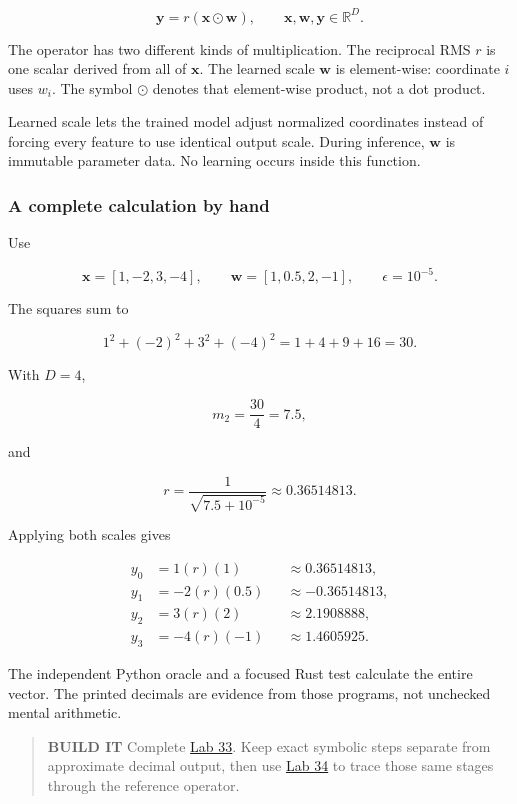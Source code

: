 \documentclass[
  10pt,
]{article}
\begin{document}
\[
\mathbf{y}=r(\mathbf{x}\odot\mathbf{w}),
\qquad
\mathbf{x},\mathbf{w},\mathbf{y}\in\mathbb{R}^{D}.
\]

The operator has two different kinds of multiplication. The reciprocal
RMS \(r\) is one scalar derived from all of \(\mathbf{x}\). The learned
scale \(\mathbf{w}\) is element-wise: coordinate \(i\) uses \(w_i\). The
symbol \(\odot\) denotes that element-wise product, not a dot product.

Learned scale lets the trained model adjust normalized coordinates
instead of forcing every feature to use identical output scale. During
inference, \(\mathbf{w}\) is immutable parameter data. No learning
occurs inside this function.


\subsubsection{A complete calculation by
hand}\label{a-complete-calculation-by-hand}

Use

\[
\mathbf{x}=[1,-2,3,-4],\qquad
\mathbf{w}=[1,0.5,2,-1],\qquad
\epsilon=10^{-5}.
\]

The squares sum to

\[
1^2+(-2)^2+3^2+(-4)^2=1+4+9+16=30.
\]

With \(D=4\),

\[
m_2=\frac{30}{4}=7.5,
\]

and

\[
r=\frac{1}{\sqrt{7.5+10^{-5}}}
\approx0.36514813.
\]

Applying both scales gives

\[
\begin{aligned}
y_0&= 1(r)(1)       &&\approx 0.36514813,\\
y_1&=-2(r)(0.5)     &&\approx-0.36514813,\\
y_2&= 3(r)(2)       &&\approx 2.1908888,\\
y_3&=-4(r)(-1)      &&\approx 1.4605925.
\end{aligned}
\]

The independent Python oracle and a focused Rust test calculate the
entire vector. The printed decimals are evidence from those programs,
not unchecked mental arithmetic.

\begin{quote}
\textbf{BUILD IT} Complete
\href{https://github.com/hermonai/inside-the-llm-engine/blob/astra-visual-rewrite/labs/lab-33-compute-rms-by-hand.md}{Lab
33}. Keep exact symbolic steps separate from approximate decimal output,
then use
\href{https://github.com/hermonai/inside-the-llm-engine/blob/astra-visual-rewrite/labs/lab-34-implement-rmsnorm.md}{Lab
34} to trace those same stages through the reference operator.
\end{quote}
\end{document}

